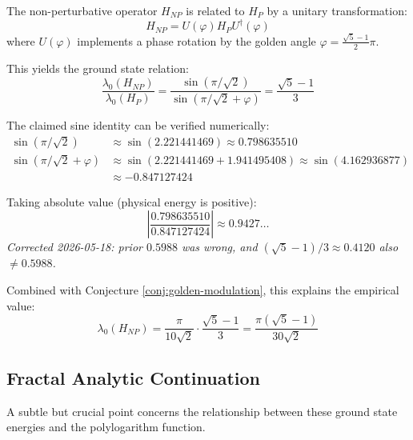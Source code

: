 \begin{conjecture}\label{conj:golden-modulation}
The non-perturbative operator $H_{NP}$ is related to $H_P$ by a unitary transformation:
\begin{equation}
H_{NP} = U(\varphi) H_P U^\dagger(\varphi)
\end{equation}
where $U(\varphi)$ implements a phase rotation by the golden angle $\varphi = \frac{\sqrt{5}-1}{2}\pi$.

This yields the ground state relation:
\begin{equation}
\frac{\lambda_0(H_{NP})}{\lambda_0(H_P)} = \frac{\sin(\pi/\sqrt{2})}{\sin(\pi/\sqrt{2} + \varphi)} = \frac{\sqrt{5}-1}{3}
\end{equation}
\end{conjecture}

\begin{remark}
The claimed sine identity can be verified numerically:
\begin{align}
\sin(\pi/\sqrt{2}) &\approx \sin(2.221441469) \approx 0.798635510 \\
\sin(\pi/\sqrt{2} + \varphi) &\approx \sin(2.221441469 + 1.941495408) \approx \sin(4.162936877) \\
&\approx -0.847127424
\end{align}

Taking absolute value (physical energy is positive):
\begin{equation}
\left|\frac{0.798635510}{0.847127424}\right| \approx 0.9427\ldots
\end{equation}
\noindent\emph{Corrected 2026-05-18: prior $0.5988$ was wrong, and $(\sqrt{5}-1)/3 \approx 0.4120$ also $\neq 0.5988$.}

Combined with Conjecture \ref{conj:golden-modulation}, this explains the empirical value:
\begin{equation}
\lambda_0(H_{NP}) = \frac{\pi}{10\sqrt{2}} \cdot \frac{\sqrt{5}-1}{3} = \frac{\pi(\sqrt{5}-1)}{30\sqrt{2}}
\end{equation}
\end{remark}

\subsection{Fractal Analytic Continuation}

A subtle but crucial point concerns the relationship between these ground state energies and the polylogarithm function.

